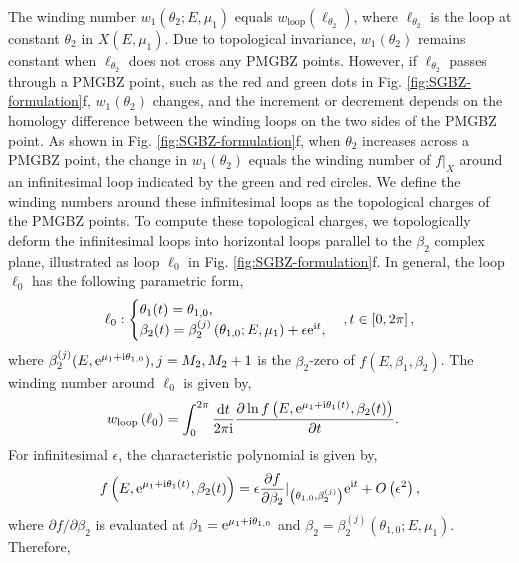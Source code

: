 \documentclass[pdflatex,sn-nature, iicol]{sn-jnl}%
\theoremstyle{thmstyleone}%
\theoremstyle{thmstyletwo}%
\theoremstyle{thmstylethree}%
\begin{document}
The winding number $w_{1}(\theta_{2};E,\mu_{1})$ equals $w_{\text{loop}}(\ell_{\theta_{2}})$,
where $\ell_{\theta_{2}}$ is the loop at constant $\theta_{2}$ in
$X(E,\mu_{1})$. Due to topological invariance, $w_{1}(\theta_{2})$
remains constant when $\ell_{\theta_{2}}$ does not cross any PMGBZ
points. However, if $\ell_{\theta_{2}}$ passes through a PMGBZ point,
such as the red and green dots in Fig. \ref{fig:SGBZ-formulation}f,
$w_{1}(\theta_{2})$ changes, and the increment or decrement depends
on the homology difference between the winding loops on the two sides
of the PMGBZ point. As shown in Fig. \ref{fig:SGBZ-formulation}f,
when $\theta_{2}$ increases across a PMGBZ point, the change in $w_{1}(\theta_{2})$
equals the winding number of $f|_{X}$ around an infinitesimal loop
indicated by the green and red circles. We define the winding numbers
around these infinitesimal loops as the topological charges of the
PMGBZ points. To compute these topological charges, we topologically
deform the infinitesimal loops into horizontal loops parallel to the
$\beta_{2}$ complex plane, illustrated as loop $\ell_{0}$ in Fig.
\ref{fig:SGBZ-formulation}f. In general, the loop $\ell_{0}$ has
the following parametric form, 
\begin{equation}
\ell_{0}:\begin{cases}
\theta_{1}(t)=\theta_{1,0},\\
\beta_{2}(t)=\beta_{2}^{(j)}\left(\theta_{1,0};E,\mu_{1}\right)+\epsilon\mathrm{e}^{\mathrm{i} t},
\end{cases},t\in\left[0,2\pi\right],
\end{equation}
where $\beta_{2}^{(j)}(E,\mathrm{e}^{\mu_{1}+\mathrm{i}\theta_{1,0}}),j=M_{2},M_{2}+1$
is the $\beta_{2}$-zero of $f(E,\beta_{1},\beta_{2})$. The winding
number around $\ell_{0}$ is given by, 
\begin{align}
w_{\text{loop}}\left(\ell_{0}\right) & =\int_{0}^{2\pi}\frac{\mathrm{d} t}{2\pi\mathrm{i}}\frac{\partial\ln f\left(E,\mathrm{e}^{\mu_{1}+\mathrm{i}\theta_{1}(t)},\beta_{2}(t)\right)}{\partial t}.
\end{align}
For infinitesimal $\epsilon$, the characteristic polynomial is given
by, 
\begin{equation}
f\left(E,\mathrm{e}^{\mu_{1}+\mathrm{i}\theta_{1}(t)},\beta_{2}(t)\right)=\epsilon\frac{\partial f}{\partial\beta_{2}}|_{\left(\theta_{1,0},\beta_{2}^{(j)}\right)}\mathrm{e}^{\mathrm{i} t}+O\left(\epsilon^{2}\right),
\end{equation}
where $\partial f/\partial\beta_{2}$ is evaluated at $\beta_{1}=\mathrm{e}^{\mu_{1}+\mathrm{i}\theta_{1,0}}$
and $\beta_{2}=\beta_{2}^{(j)}(\theta_{1,0};E,\mu_{1})$. Therefore,
\end{document}
